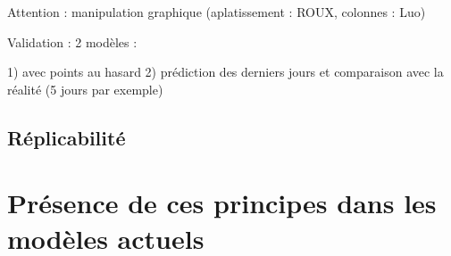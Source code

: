 \documentclass[review]{elsarticle}
\begin{document}
Attention : manipulation graphique (aplatissement : ROUX, colonnes : Luo)

Validation : 2 modèles : 

1) avec points au hasard
2) prédiction des derniers jours et comparaison avec la réalité (5 jours par exemple)


\subsection{Réplicabilité}



\section{Présence de ces principes dans les modèles actuels}
\end{document}
